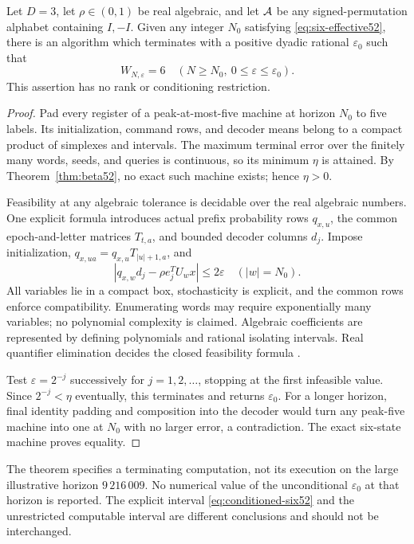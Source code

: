 \begin{theorem}
\label{thm:computable-six52}
Let $D=3$, let $\rho\in(0,1)$ be real algebraic, and let $\mathcal A$ be
any signed-permutation alphabet containing $I,-I$. Given any integer
$N_0$ satisfying \eqref{eq:six-effective52}, there is an algorithm
which terminates with a positive dyadic rational $\varepsilon_0$ such
that
\[
          W_{N,\varepsilon}=6\quad
          (N\ge N_0,\ 0\le\varepsilon\le\varepsilon_0).
\]
This assertion has no rank or conditioning restriction.
\end{theorem}
\begin{proof}
Pad every register of a peak-at-most-five machine at horizon $N_0$
to five labels. Its initialization, command rows, and decoder means
belong to a compact product of simplexes and intervals. The maximum
terminal error over the finitely many words, seeds, and queries is
continuous, so its minimum $\eta$ is attained. By
Theorem~\ref{thm:beta52}, no exact such machine exists; hence $\eta>0$.

Feasibility at any algebraic tolerance is decidable over the real
algebraic numbers. One explicit formula introduces actual prefix
probability rows $q_{x,u}$, the common epoch-and-letter matrices
$T_{t,a}$, and bounded decoder columns $d_j$. Impose initialization,
$q_{x,ua}=q_{x,u}T_{|u|+1,a}$, and
\[
 |q_{x,w}d_j-\rho e_j^TU_wx|\le2\varepsilon
 \quad (|w|=N_0).
\]
All variables lie in a compact box, stochasticity is explicit, and
the common rows enforce compatibility. Enumerating words may require
exponentially many variables; no polynomial complexity is claimed.
Algebraic coefficients are represented by defining polynomials and
rational isolating intervals. Real quantifier elimination decides the
closed feasibility formula \cite{BPR}.

Test $\varepsilon=2^{-j}$ successively for $j=1,2,\ldots$, stopping
at the first infeasible value. Since $2^{-j}<\eta$ eventually, this
terminates and returns $\varepsilon_0$. For a longer horizon, final
identity padding and composition into the decoder would turn any
peak-five machine into one at $N_0$ with no larger error, a
contradiction. The exact six-state machine proves equality.
\end{proof}

The theorem specifies a terminating computation, not its execution on
the large illustrative horizon $9\,216\,009$. No numerical value of
the unconditional $\varepsilon_0$ at that horizon is reported. The
explicit interval \eqref{eq:conditioned-six52} and the unrestricted
computable interval are different conclusions and should not be
interchanged.

